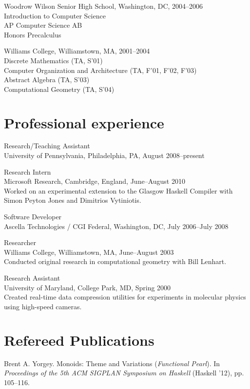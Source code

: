 \documentclass{article}
\newcommand{\cvitem}{\par\hangpara{2em}{1}}
\begin{document}
\cvitem
Woodrow Wilson Senior High School, Washington, DC, 2004--2006 \\
Introduction to Computer Science \\
AP Computer Science AB \\
Honors Precalculus

\cvitem
Williams College, Williamstown, MA, 2001--2004 \\
Discrete Mathematics (TA, S'01) \\
Computer Organization and Architecture (TA, F'01, F'02, F'03) \\
Abstract Algebra (TA, S'03) \\
Computational Geometry (TA, S'04) \\

\section*{Professional experience}
\cvitem
Research/Teaching Assistant \\
University of Pennsylvania, Philadelphia, PA, August 2008--present

\cvitem
Research Intern \\
Microsoft Research, Cambridge, England, June--August 2010 \\
Worked on an experimental extension to the Glasgow Haskell Compiler with
Simon Peyton Jones and Dimitrios Vytiniotis.

\cvitem
Software Developer \\
Ascella Technologies / CGI Federal, Washington,
DC, July 2006--July 2008

\cvitem
Researcher \\
Williams College, Williamstown, MA, June--August 2003 \\
Conducted original research in computational geometry with Bill Lenhart.

\cvitem
Research Assistant \\
University of Maryland, College Park, MD, Spring 2000 \\
Created real-time data compression utilities for experiments in
molecular physics using high-speed cameras.

\section*{Refereed Publications}

\cvitem Brent A. Yorgey. Monoids: Theme and Variations
(\emph{Functional Pearl}).  In \emph{Proceedings of the 5th ACM
  SIGPLAN Symposium on Haskell} (Haskell '12), pp. 105--116.
\end{document}
